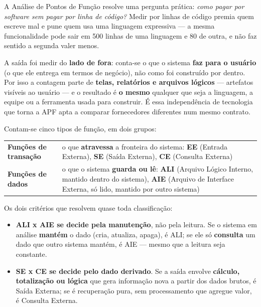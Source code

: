 \begin{conceito}
A Análise de Pontos de Função resolve uma pergunta prática: \textit{como
pagar por software sem pagar por linha de código?} Medir por linhas de
código premia quem escreve mal e pune quem usa uma linguagem expressiva ---
a mesma funcionalidade pode sair em 500 linhas de uma linguagem e 80 de
outra, e não faz sentido a segunda valer menos.

A saída foi medir do \textbf{lado de fora}: conta-se o que o sistema
\textbf{faz para o usuário} (o que ele entrega em termos de negócio), não
como foi construído por dentro. Por isso a contagem parte de
\textbf{telas, relatórios e arquivos lógicos} --- artefatos visíveis ao
usuário --- e o resultado é \textbf{o mesmo} qualquer que seja a
linguagem, a equipe ou a ferramenta usada para construir. É essa
independência de tecnologia que torna a APF apta a comparar fornecedores
diferentes num mesmo contrato.

Contam-se cinco tipos de função, em dois grupos:

\begin{center}
\begin{tabular}{@{}p{2.6cm}p{9.6cm}@{}}
\toprule
\textbf{Funções de transação} & o que \textbf{atravessa} a fronteira do
sistema: \textbf{EE} (Entrada Externa), \textbf{SE} (Saída Externa),
\textbf{CE} (Consulta Externa) \\
\addlinespace
\textbf{Funções de dados} & o que o sistema \textbf{guarda ou lê}:
\textbf{ALI} (Arquivo Lógico Interno, mantido dentro do sistema),
\textbf{AIE} (Arquivo de Interface Externa, só lido, mantido por outro
sistema) \\
\bottomrule
\end{tabular}
\end{center}

Os dois critérios que resolvem quase toda classificação:

\begin{itemize}
\item \textbf{ALI x AIE se decide pela manutenção}, não pela leitura. Se o
sistema em análise \textbf{mantém} o dado (cria, atualiza, apaga), é ALI;
se ele só \textbf{consulta} um dado que outro sistema mantém, é AIE ---
mesmo que a leitura seja constante.
\item \textbf{SE x CE se decide pelo dado derivado}. Se a saída envolve
\textbf{cálculo, totalização ou lógica} que gera informação nova a partir
dos dados brutos, é Saída Externa; se é recuperação pura, sem processamento
que agregue valor, é Consulta Externa.
\end{itemize}
\end{conceito}

